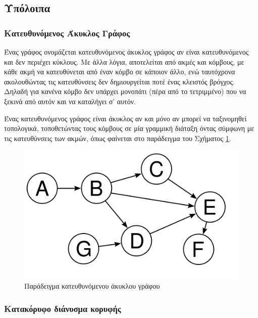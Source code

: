 \subsection{Υπόλοιπα}

\subsubsection{Κατευθυνόμενος Άκυκλος Γράφος}
	\label{definition:directed_acyclic_graph}
	Ένας γράφος ονομάζεται κατευθυνόμενος άκυκλος γράφος αν είναι κατευθυνόμενος και δεν περιέχει κύκλους. Με άλλα λόγια, αποτελείται από ακμές και κόμβους, με κάθε ακμή να κατευθύνεται από έναν κόμβο σε κάποιον άλλο, ενώ ταυτόχρονα ακολουθώντας τις κατευθύνσεις δεν δημιουργείται ποτέ ένας κλειστός βρόγχος. Δηλαδή για κανένα κόμβο δεν υπάρχει μονοπάτι (πέρα από το τετριμμένο) που να ξεκινά από αυτόν και να καταλήγει σ' αυτόν.
	
	Ένας κατευθυνόμενος γράφος είναι άκυκλος αν και μόνο αν μπορεί να ταξινομηθεί τοπολογικά, τοποθετώντας τους κόμβους σε μία γραμμική διάταξη όντας σύμφωνη με τις κατευθύνσεις των ακμών, όπως φαίνεται στο παράδειγμα του Σχήματος \ref{fig:directed_acyclic_graph}.
	
\begin{figure}[H]
	\centering
	\includegraphics[scale=0.5]{images/appendix/directed_acyclic_graph.png}
	\caption{Παράδειγμα κατευθυνόμενου άκυκλου γράφου}
	\label{fig:directed_acyclic_graph}
\end{figure}


\subsubsection{Κατακόρυφο διάνυσμα κορυφής}
\label{definition:vertex_normal}

